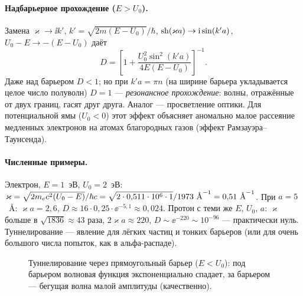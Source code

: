 \paragraph{Надбарьерное прохождение ($E>U_0$).} Замена $\varkappa\to\ii k'$, $k'=\sqrt{2m(E-U_0)}/\hbar$,
$\operatorname{sh}(\varkappa a)\to\mathrm{i}\sin(k'a)$, $U_0-E\to-(E-U_0)$ даёт
\begin{equation}\label{eq:7:Dabove}
  D=\left[1+\frac{U_0^2\sin^2(k'a)}{4E(E-U_0)}\right]^{-1}.
\end{equation}
Даже над барьером $D<1$; но при $k'a=\pi n$ (на ширине барьера укладывается целое число
полуволн) $D=1$ — \emph{резонансное прохождение}: волны, отражённые от двух границ, гасят
друг друга. Аналог — просветление оптики. Для потенциальной ямы ($U_0<0$) этот эффект
объясняет аномально малое рассеяние медленных электронов на атомах благородных газов
(эффект Рамзауэра--Таунсенда).

\paragraph{Численные примеры.} Электрон, $E=1$~эВ, $U_0=2$~эВ:
$\varkappa=\sqrt{2\mel c^2(U_0-E)}/\hbar c=\sqrt{2\cdot0{,}511\cdot10^6\cdot1}/1973\ \text{Å}^{-1}=0{,}51\ \text{Å}^{-1}$.
При $a=5$~Å: $\varkappa a=2{,}6$, $D\approx16\cdot0{,}25\cdot\ee^{-5{,}1}\approx0{,}024$. Протон с теми же $E$, $U_0$, $a$:
$\varkappa$ больше в $\sqrt{1836}\approx43$ раза, $2\varkappa a\approx220$, $D\sim\ee^{-220}\sim10^{-96}$ —
практически нуль. Туннелирование — явление для лёгких частиц и тонких барьеров (или для очень
большого числа попыток, как в альфа-распаде).

\begin{figure}[htbp]
\centering
{}
\caption{Туннелирование через прямоугольный барьер ($E<U_0$): под барьером волновая функция
экспоненциально спадает, за барьером — бегущая волна малой амплитуды (качественно).}
\label{fig:7:barrier}
\end{figure}

